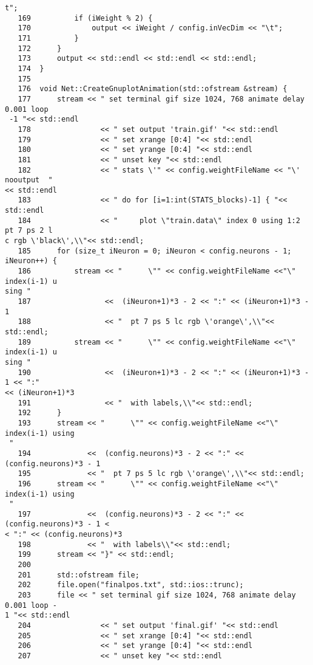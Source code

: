 \begin{verbatim}
t";
   169	        if (iWeight % 2) {
   170	            output << iWeight / config.inVecDim << "\t";
   171	        }
   172	    }
   173	    output << std::endl << std::endl << std::endl;
   174	}
   175	
   176	void Net::CreateGnuplotAnimation(std::ofstream &stream) {
   177	    stream << " set terminal gif size 1024, 768 animate delay 0.001 loop
 -1 "<< std::endl
   178	              << " set output 'train.gif' "<< std::endl
   179	              << " set xrange [0:4] "<< std::endl
   180	              << " set yrange [0:4] "<< std::endl
   181	              << " unset key "<< std::endl              
   182	              << " stats \'" << config.weightFileName << "\' nooutput  "
<< std::endl
   183	              << " do for [i=1:int(STATS_blocks)-1] { "<< std::endl
   184	              << "     plot \"train.data\" index 0 using 1:2 pt 7 ps 2 l
c rgb \'black\',\\"<< std::endl;
   185	    for (size_t iNeuron = 0; iNeuron < config.neurons - 1; iNeuron++) {
   186	        stream << "      \"" << config.weightFileName <<"\" index(i-1) u
sing " 
   187	               <<  (iNeuron+1)*3 - 2 << ":" << (iNeuron+1)*3 - 1
   188	               << "  pt 7 ps 5 lc rgb \'orange\',\\"<< std::endl;
   189	        stream << "      \"" << config.weightFileName <<"\" index(i-1) u
sing " 
   190	               <<  (iNeuron+1)*3 - 2 << ":" << (iNeuron+1)*3 - 1 << ":" 
<< (iNeuron+1)*3
   191	               << "  with labels,\\"<< std::endl;
   192	    }
   193	    stream << "      \"" << config.weightFileName <<"\" index(i-1) using
 " 
   194	           <<  (config.neurons)*3 - 2 << ":" << (config.neurons)*3 - 1
   195	           << "  pt 7 ps 5 lc rgb \'orange\',\\"<< std::endl;
   196	    stream << "      \"" << config.weightFileName <<"\" index(i-1) using
 " 
   197	           <<  (config.neurons)*3 - 2 << ":" << (config.neurons)*3 - 1 <
< ":" << (config.neurons)*3
   198	           << "  with labels\\"<< std::endl;
   199	    stream << "}" << std::endl;
   200	
   201	    std::ofstream file;
   202	    file.open("finalpos.txt", std::ios::trunc);
   203	    file << " set terminal gif size 1024, 768 animate delay 0.001 loop -
1 "<< std::endl
   204	              << " set output 'final.gif' "<< std::endl
   205	              << " set xrange [0:4] "<< std::endl
   206	              << " set yrange [0:4] "<< std::endl
   207	              << " unset key "<< std::endl              

\end{verbatim}
